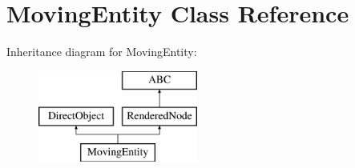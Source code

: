 \hypertarget{classmovingentity_1_1_moving_entity}{}\section{Moving\+Entity Class Reference}
\label{classmovingentity_1_1_moving_entity}
Inheritance diagram for Moving\+Entity\+:\begin{figure}[H]
\begin{center}
\leavevmode
\includegraphics[height=3.000000cm]{classmovingentity_1_1_moving_entity}
\end{center}
\end{figure}
